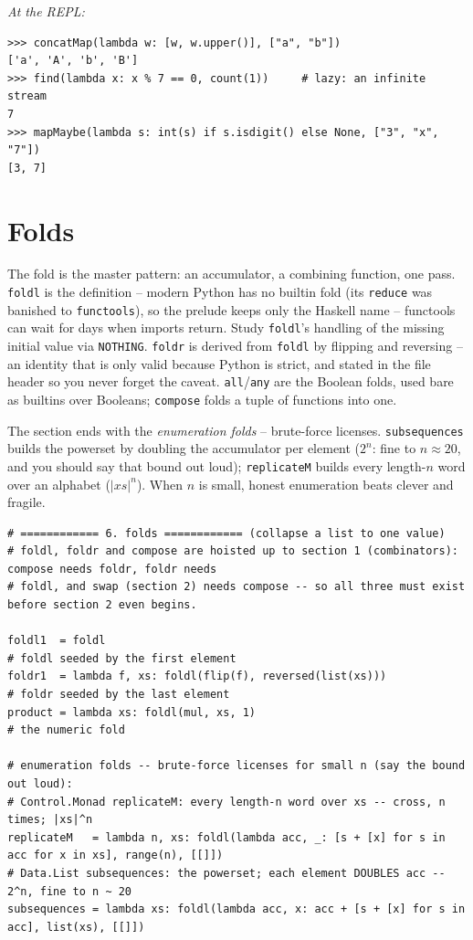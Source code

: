 \documentclass[11pt,letterpaper]{book}
\begin{document}
\noindent\textit{At the REPL:}
\begin{lstlisting}[style=spec]
>>> concatMap(lambda w: [w, w.upper()], ["a", "b"])
['a', 'A', 'b', 'B']
>>> find(lambda x: x % 7 == 0, count(1))     # lazy: an infinite stream
7
>>> mapMaybe(lambda s: int(s) if s.isdigit() else None, ["3", "x", "7"])
[3, 7]
\end{lstlisting}
\chapter{Folds}

The fold is the master pattern: an accumulator, a combining function, one pass.
\texttt{foldl} is the definition -- modern Python has no builtin fold (its
\texttt{reduce} was banished to \texttt{functools}), so the prelude keeps only
the Haskell name -- functools can wait for days when imports return. Study
\texttt{foldl}'s handling of the missing initial value via
\texttt{NOTHING}. \texttt{foldr} is derived from
\texttt{foldl} by flipping and reversing -- an identity that is only valid
because Python is strict, and stated in the file header so you never forget the
caveat. \texttt{all}/\texttt{any} are the Boolean folds, used bare as builtins
over Booleans; \texttt{compose} folds a tuple of functions into one.

The section ends with the \emph{enumeration folds} -- brute-force licenses.
\texttt{subsequences} builds the powerset by doubling the accumulator per
element ($2^n$: fine to $n \approx 20$, and you should say that bound out
loud); \texttt{replicateM} builds every length-$n$ word over an alphabet
($|xs|^n$). When $n$ is small, honest enumeration beats clever and fragile.
\begin{lstlisting}[style=code]
# ============ 6. folds ============ (collapse a list to one value)
# foldl, foldr and compose are hoisted up to section 1 (combinators): compose needs foldr, foldr needs
# foldl, and swap (section 2) needs compose -- so all three must exist before section 2 even begins.

foldl1  = foldl                                                         # foldl seeded by the first element
foldr1  = lambda f, xs: foldl(flip(f), reversed(list(xs)))              # foldr seeded by the last element
product = lambda xs: foldl(mul, xs, 1)                                  # the numeric fold

# enumeration folds -- brute-force licenses for small n (say the bound out loud):
# Control.Monad replicateM: every length-n word over xs -- cross, n times; |xs|^n
replicateM   = lambda n, xs: foldl(lambda acc, _: [s + [x] for s in acc for x in xs], range(n), [[]])
# Data.List subsequences: the powerset; each element DOUBLES acc -- 2^n, fine to n ~ 20
subsequences = lambda xs: foldl(lambda acc, x: acc + [s + [x] for s in acc], list(xs), [[]])
\end{lstlisting}
\end{document}
